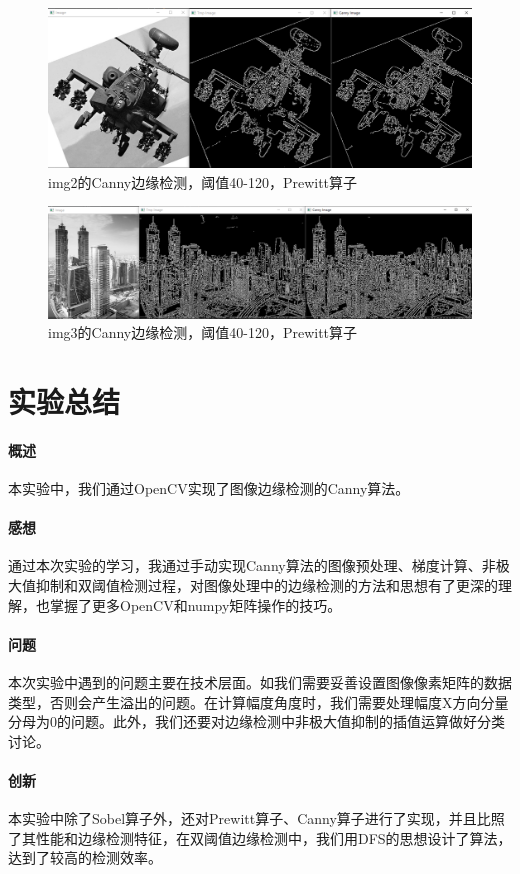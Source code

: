 \documentclass{article}
\begin{document}
\begin{figure}[htbp]
\centering
\includegraphics[width=13.5cm]{img/3-2.png}
\caption{img2的Canny边缘检测，阈值40-120，Prewitt算子}
\label{8}
\end{figure}

\begin{figure}[htbp]
\centering
\includegraphics[width=13.5cm]{img/3-3.png}
\caption{img3的Canny边缘检测，阈值40-120，Prewitt算子}
\label{9}
\end{figure}

\section{实验总结}
\paragraph{概述}
本实验中，我们通过OpenCV实现了图像边缘检测的Canny算法。

\paragraph{感想}
通过本次实验的学习，我通过手动实现Canny算法的图像预处理、梯度计算、非极大值抑制和双阈值检测过程，对图像处理中的边缘检测的方法和思想有了更深的理解，也掌握了更多OpenCV和numpy矩阵操作的技巧。

\paragraph{问题}
本次实验中遇到的问题主要在技术层面。如我们需要妥善设置图像像素矩阵的数据类型，否则会产生溢出的问题。在计算幅度角度时，我们需要处理幅度X方向分量分母为0的问题。此外，我们还要对边缘检测中非极大值抑制的插值运算做好分类讨论。

\paragraph{创新}
本实验中除了Sobel算子外，还对Prewitt算子、Canny算子进行了实现，并且比照了其性能和边缘检测特征，在双阈值边缘检测中，我们用DFS的思想设计了算法，达到了较高的检测效率。
\end{document}
